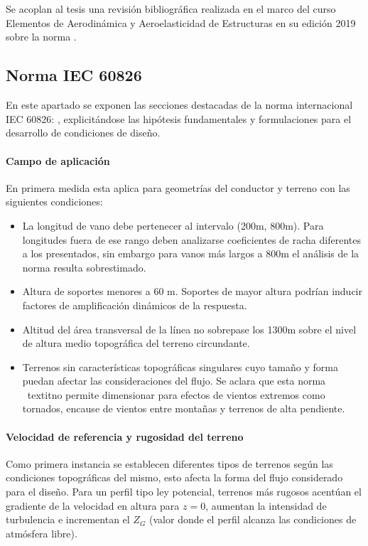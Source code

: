 \chapter{}\label{Ane1}
Se acoplan al tesis una revisión bibliográfica realizada en el marco del curso Elementos de Aerodinámica y Aeroelasticidad de Estructuras en su edición 2019 sobre la norma \cite{IEC60826}.
\section{Norma IEC 60826} \label{NormaIEC}
En este apartado se exponen las secciones destacadas de la norma internacional IEC 60826: \cite{IEC60826}, explicitándose las hipótesis fundamentales y  formulaciones para el desarrollo de condiciones de diseño. 

\subsubsection{Campo de aplicación}
En primera medida esta aplica para geometrías del conductor y terreno con las siguientes condiciones:

\begin{itemize}
	\item La longitud de vano debe pertenecer al intervalo (200\vspace{0.1cm}m, 800\vspace{0.1cm}m). Para longitudes fuera de ese rango deben analizarse coeficientes de racha diferentes a los presentados, sin embargo para vanos más largos a 800m el análisis de la norma resulta sobrestimado.
	\item Altura de soportes menores a 60 \vspace{0.1cm}m. Soportes de mayor altura podrían inducir factores de amplificación dinámicos de la respuesta.
	\item Altitud del área transversal de la línea no sobrepase los 1300\vspace{0.1cm}m sobre el nivel de altura medio topográfica del terreno circundante.
	\item Terrenos  sin características topográficas singulares cuyo tamaño y forma puedan afectar las consideraciones del flujo. Se aclara que esta norma \ textit{no permite dimensionar para efectos de vientos extremos como tornados, encause de vientos entre montañas y terrenos de alta pendiente. }
\end{itemize}

\subsubsection{Velocidad de referencia y rugosidad del terreno}
Como primera instancia se establecen diferentes tipos de terrenos según las condiciones topográficas del mismo, esto afecta la forma del flujo considerado para el diseño. Para un perfil tipo ley potencial, terrenos más rugosos acentúan el gradiente de la velocidad en altura para $z=0$,  aumentan la intensidad de turbulencia e incrementan el $Z_G$ (valor donde el perfil alcanza las condiciones de atmósfera libre). 


